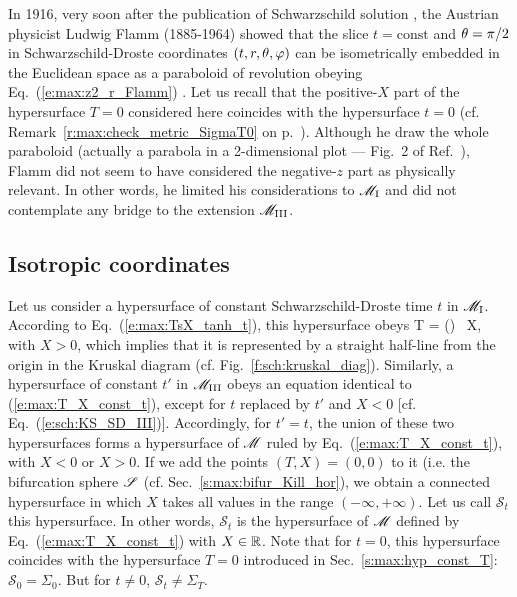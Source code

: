 \begin{hist}
In 1916, very soon after the publication of Schwarzschild solution
\cite{Schwa1916}, the Austrian physicist Ludwig Flamm (1885-1964) showed that the slice $t=\mathrm{const}$
and $\theta=\pi/2$ in Schwarzschild-Droste coordinates $(t,r,\theta,\varphi)$
can be isometrically embedded in the Euclidean space as a paraboloid of
revolution obeying Eq.~(\ref{e:max:z2_r_Flamm}) \cite{Flamm1916}.
Let us recall that the positive-$X$ part of the hypersurface $T=0$ considered here coincides with the
hypersurface $t=0$ (cf. Remark~\ref{r:max:check_metric_SigmaT0} on p.~\pageref{r:max:check_metric_SigmaT0}). Although he draw the whole paraboloid (actually
a parabola in a 2-dimensional plot --- Fig.~2 of Ref.~\cite{Flamm1916}), Flamm did not seem to have considered
the negative-$z$ part as physically relevant. In other words,
he limited his considerations to $\mathscr{M}_{\rm I}$ and did not contemplate any bridge to
the extension $\mathscr{M}_{\rm III}$.
\end{hist}

\subsection{Isotropic coordinates}

Let us consider a hypersurface of constant Schwarzschild-Droste time $t$
in $\mathscr{M}_{\rm I}$. According to Eq.~(\ref{e:max:TsX_tanh_t}), this hypersurface
obeys
\be \label{e:max:T_X_const_t}
    T = \tanh\left(\right) \, X,
\ee
with $X>0$,
which implies that it is represented by a straight half-line from the origin
in the Kruskal diagram (cf. Fig.~\ref{f:sch:kruskal_diag}).
Similarly, a hypersurface of constant $t'$
in $\mathscr{M}_{\rm III}$ obeys an equation identical to (\ref{e:max:T_X_const_t}),
except for $t$ replaced by $t'$ and $X<0$ [cf. Eq.~(\ref{e:sch:KS_SD_III})].
Accordingly, for $t'=t$, the union of these two hypersurfaces
forms a hypersurface of $\mathscr{M}$ ruled by Eq.~(\ref{e:max:T_X_const_t}),
with $X<0$ or $X>0$. If we add the points $(T,X)=(0,0)$ to it (i.e. the
bifurcation sphere $\mathscr{S}$ (cf. Sec.~\ref{s:max:bifur_Kill_hor}),
we obtain a connected hypersurface in which $X$ takes all values in
the range $(-\infty,+\infty)$. Let us call $\mathcal{S}_t$ this hypersurface.
In other words, $\mathcal{S}_t$ is the hypersurface of $\mathscr{M}$ defined by
Eq.~(\ref{e:max:T_X_const_t}) with $X\in\mathbb{R}$.
Note that for $t=0$, this hypersurface coincides with the hypersurface
$T=0$ introduced in Sec.~\ref{s:max:hyp_const_T}: $\mathcal{S}_0 = \Sigma_0$.
But for $t\not=0$, $\mathcal{S}_t \not= \Sigma_T$.

